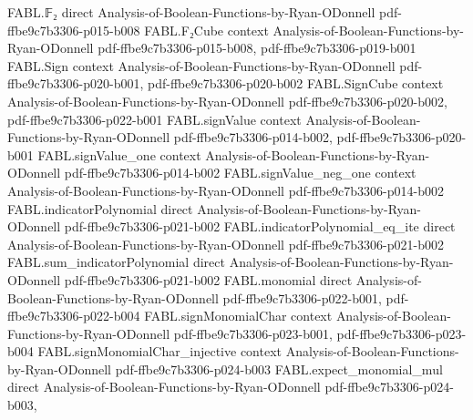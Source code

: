 \begin{theorem}
\label{FABL.hastadAcceptanceProbability_eq_fourierSum}
\leanok
{}
\proofstep
  {FABL.𝔽₂}
  {direct}
  {Analysis-of-Boolean-Functions-by-Ryan-ODonnell}
  {pdf-ffbe9c7b3306-p015-b008}
\proofstep
  {FABL.F₂Cube}
  {context}
  {Analysis-of-Boolean-Functions-by-Ryan-ODonnell}
  {pdf-ffbe9c7b3306-p015-b008,
    pdf-ffbe9c7b3306-p019-b001}
\proofstep
  {FABL.Sign}
  {context}
  {Analysis-of-Boolean-Functions-by-Ryan-ODonnell}
  {pdf-ffbe9c7b3306-p020-b001,
    pdf-ffbe9c7b3306-p020-b002}
\proofstep
  {FABL.SignCube}
  {context}
  {Analysis-of-Boolean-Functions-by-Ryan-ODonnell}
  {pdf-ffbe9c7b3306-p020-b002,
    pdf-ffbe9c7b3306-p022-b001}
\proofstep
  {FABL.signValue}
  {context}
  {Analysis-of-Boolean-Functions-by-Ryan-ODonnell}
  {pdf-ffbe9c7b3306-p014-b002,
    pdf-ffbe9c7b3306-p020-b001}
\proofstep
  {FABL.signValue_one}
  {context}
  {Analysis-of-Boolean-Functions-by-Ryan-ODonnell}
  {pdf-ffbe9c7b3306-p014-b002}
\proofstep
  {FABL.signValue_neg_one}
  {context}
  {Analysis-of-Boolean-Functions-by-Ryan-ODonnell}
  {pdf-ffbe9c7b3306-p014-b002}
\proofstep
  {FABL.indicatorPolynomial}
  {direct}
  {Analysis-of-Boolean-Functions-by-Ryan-ODonnell}
  {pdf-ffbe9c7b3306-p021-b002}
\proofstep
  {FABL.indicatorPolynomial_eq_ite}
  {direct}
  {Analysis-of-Boolean-Functions-by-Ryan-ODonnell}
  {pdf-ffbe9c7b3306-p021-b002}
\proofstep
  {FABL.sum_indicatorPolynomial}
  {direct}
  {Analysis-of-Boolean-Functions-by-Ryan-ODonnell}
  {pdf-ffbe9c7b3306-p021-b002}
\proofstep
  {FABL.monomial}
  {direct}
  {Analysis-of-Boolean-Functions-by-Ryan-ODonnell}
  {pdf-ffbe9c7b3306-p022-b001,
    pdf-ffbe9c7b3306-p022-b004}
\proofstep
  {FABL.signMonomialChar}
  {context}
  {Analysis-of-Boolean-Functions-by-Ryan-ODonnell}
  {pdf-ffbe9c7b3306-p023-b001,
    pdf-ffbe9c7b3306-p023-b004}
\proofstep
  {FABL.signMonomialChar_injective}
  {context}
  {Analysis-of-Boolean-Functions-by-Ryan-ODonnell}
  {pdf-ffbe9c7b3306-p024-b003}
\proofstep
  {FABL.expect_monomial_mul}
  {direct}
  {Analysis-of-Boolean-Functions-by-Ryan-ODonnell}
  {pdf-ffbe9c7b3306-p024-b003,
}
\end{theorem}
